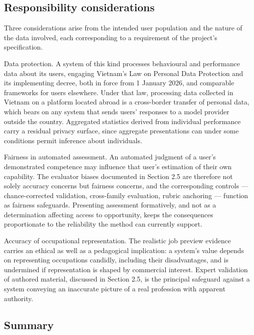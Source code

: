\subsection{Responsibility considerations}

Three considerations arise from the intended user population and the nature of the data involved, each corresponding to a requirement of the project's specification.

Data protection. A system of this kind processes behavioural and performance data about its users, engaging Vietnam's Law on Personal Data Protection\cite{r99} and its implementing decree\cite{r100}, both in force from 1 January 2026, and comparable frameworks for users elsewhere. Under that law, processing data collected in Vietnam on a platform located abroad is a cross-\allowbreak{}border transfer of personal data, which bears on any system that sends users' responses to a model provider outside the country. Aggregated statistics derived from individual performance carry a residual privacy surface, since aggregate presentations can under some conditions permit inference about individuals.

Fairness in automated assessment. An automated judgment of a user's demonstrated competence may influence that user's estimation of their own capability. The evaluator biases documented in Section 2.5 are therefore not solely accuracy concerns but fairness concerns, and the corresponding controls --- chance-\allowbreak{}corrected validation, cross-\allowbreak{}family evaluation, rubric anchoring --- function as fairness safeguards. Presenting assessment formatively, and not as a determination affecting access to opportunity, keeps the consequences proportionate to the reliability the method can currently support.

Accuracy of occupational representation. The realistic job preview evidence carries an ethical as well as a pedagogical implication: a system's value depends on representing occupations candidly, including their disadvantages, and is undermined if representation is shaped by commercial interest. Expert validation of authored material, discussed in Section 2.5, is the principal safeguard against a system conveying an inaccurate picture of a real profession with apparent authority.

\subsection{Summary}

